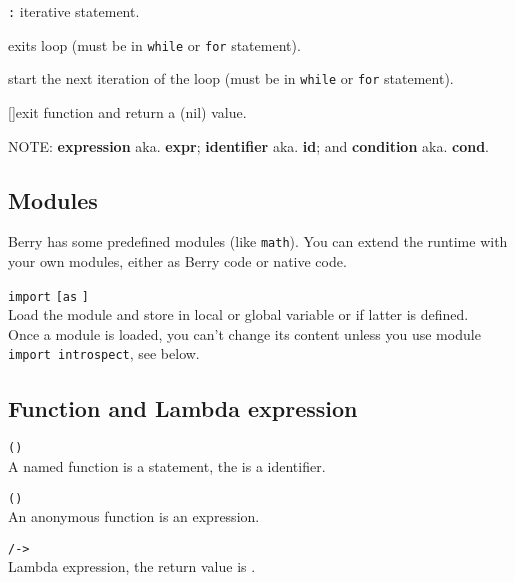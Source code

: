 \hangpar {}  

\hangpar {}   

\hangpar {}  \texttt{:}   \quad iterative statement.

\hangpar {}\quad exits loop (must be in \texttt{while} or \texttt{for} statement).

\hangpar {}\quad start the next iteration of the loop (must be in \texttt{while} or \texttt{for} statement).

\hangpar {} []\quad exit function and return a (nil) value.

\hangpar \textsf{NOTE}: \textbf{expression} aka. \textbf{expr}; \textbf{identifier} aka. \textbf{id}; and \textbf{condition} aka. \textbf{cond}.

\subsection*{Modules}

Berry has some predefined modules (like \texttt{math}). You can extend the runtime with your own modules, either as Berry code or native code.

\hangpar \texttt{import}  \texttt{[}\texttt{as} \texttt{]}\\
Load the module  and store in local or global variable  or  if latter is defined.\\

\hangpar Once a module is loaded, you can't change its content unless you use module \texttt{import introspect}, see below.

\subsection*{Function and Lambda expression}

\hangpar {}  \texttt{(}\texttt{)}   \\
A named function is a statement, the  is a identifier.

\hangpar {} \texttt{(}\texttt{)}   \\
An anonymous function is an expression.

\hangpar \texttt{/}\texttt{->} \\
Lambda expression, the return value is .


